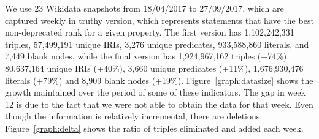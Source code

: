 \documentclass[runningheads]{llncs}
\begin{document}
We use 23 Wikidata snapshots from 18/04/2017 to 27/09/2017, which are captured weekly in truthy version, which represents statements that have the best non-deprecated rank for a given property. 
The first version has 1,102,242,331 triples, 57,499,191 unique IRIs, 3,276 unique predicates, 933,588,860 literals, and 7,449 blank nodes, while the final version has 1,924,967,162 triples (+74\%), 80,637,164 unique IRIs (+40\%), 3,660 unique predicates (+11\%), 1,676,930,476 literals (+79\%) and 8,909 blank nodes (+19\%). Figure~\ref{graph:datasize} shows the growth maintained over the period of some of these indicators. The gap in week 12 is due to the fact that we were not able to obtain the data for that week. Even though the information is relatively incremental, there are deletions. Figure~\ref{graph:delta} shows the ratio of triples eliminated and added each week.
\end{document}
